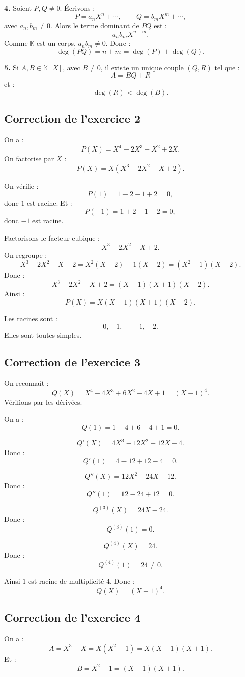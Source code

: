 \documentclass[11pt,a4paper]{article}
\newcommand{\K}{\mathbb K}
\begin{document}
\textbf{4.}  
Soient \(P,Q\neq0\).  
Écrivons :
\[
P=a_nX^n+\cdots,
\qquad
Q=b_mX^m+\cdots,
\]
avec \(a_n,b_m\neq0\).  
Alors le terme dominant de \(PQ\) est :
\[
a_nb_mX^{n+m}.
\]
Comme \(\K\) est un corps, \(a_nb_m\neq0\).  
Donc :
\[
\deg(PQ)=n+m=\deg(P)+\deg(Q).
\]

\textbf{5.}  
Si \(A,B\in\K[X]\), avec \(B\neq0\), il existe un unique couple \((Q,R)\) tel que :
\[
A=BQ+R
\]
et :
\[
\deg(R)<\deg(B).
\]

\subsection*{Correction de l'exercice 2}

On a :
\[
P(X)=X^4-2X^3-X^2+2X.
\]
On factorise par \(X\) :
\[
P(X)=X(X^3-2X^2-X+2).
\]

On vérifie :
\[
P(1)=1-2-1+2=0,
\]
donc \(1\) est racine.  
Et :
\[
P(-1)=1+2-1-2=0,
\]
donc \(-1\) est racine.

Factorisons le facteur cubique :
\[
X^3-2X^2-X+2.
\]
On regroupe :
\[
X^3-2X^2-X+2
=
X^2(X-2)-1(X-2)
=
(X^2-1)(X-2).
\]
Donc :
\[
X^3-2X^2-X+2
=
(X-1)(X+1)(X-2).
\]
Ainsi :
\[
P(X)=X(X-1)(X+1)(X-2).
\]

Les racines sont :
\[
0,\quad1,\quad-1,\quad2.
\]
Elles sont toutes simples.

\subsection*{Correction de l'exercice 3}

On reconnaît :
\[
Q(X)=X^4-4X^3+6X^2-4X+1=(X-1)^4.
\]
Vérifions par les dérivées.

On a :
\[
Q(1)=1-4+6-4+1=0.
\]

\[
Q'(X)=4X^3-12X^2+12X-4.
\]
Donc :
\[
Q'(1)=4-12+12-4=0.
\]

\[
Q''(X)=12X^2-24X+12.
\]
Donc :
\[
Q''(1)=12-24+12=0.
\]

\[
Q^{(3)}(X)=24X-24.
\]
Donc :
\[
Q^{(3)}(1)=0.
\]

\[
Q^{(4)}(X)=24.
\]
Donc :
\[
Q^{(4)}(1)=24\neq0.
\]

Ainsi \(1\) est racine de multiplicité \(4\).  
Donc :
\[
Q(X)=(X-1)^4.
\]

\subsection*{Correction de l'exercice 4}

On a :
\[
A=X^3-X=X(X^2-1)=X(X-1)(X+1).
\]
Et :
\[
B=X^2-1=(X-1)(X+1).
\]
\end{document}
